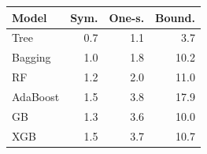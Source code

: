 \begin{tabular}{@{}lrrr@{}}
\toprule
Model & Sym. & One-s. & Bound. \\
\midrule
Tree & 0.7 & 1.1 & 3.7 \\
Bagging & 1.0 & 1.8 & 10.2 \\
RF & 1.2 & 2.0 & 11.0 \\
AdaBoost & 1.5 & 3.8 & 17.9 \\
GB & 1.3 & 3.6 & 10.0 \\
XGB & 1.5 & 3.7 & 10.7 \\
\bottomrule
\end{tabular}